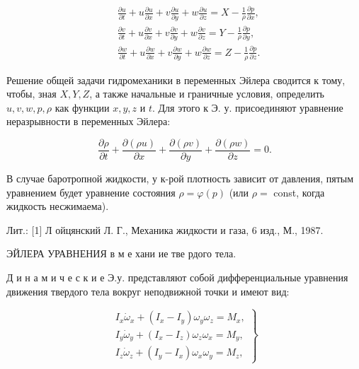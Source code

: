 \documentclass[10pt]{article}
\begin{document}
\[

\begin{aligned}

& \frac{\partial u}{\partial t}+u \frac{\partial u}{\partial x}+v \frac{\partial u}{\partial y}+w \frac{\partial u}{\partial z}=X-\frac{1}{\rho} \frac{\partial p}{\partial x}, \\

& \frac{\partial v}{\partial t}+u \frac{\partial v}{\partial x}+v \frac{\partial v}{\partial y}+w \frac{\partial v}{\partial z}=Y-\frac{1}{\rho} \frac{\partial p}{\partial y}, \\

& \frac{\partial w}{\partial t}+u \frac{\partial w}{\partial x}+v \frac{\partial w}{\partial y}+w \frac{\partial w}{\partial z}=Z-\frac{1}{\rho} \frac{\partial p}{\partial z} .

\end{aligned}

\]



Решение общей задачи гидромеханики в переменных Эйлера сводится к тому, чтобы, зная $X, Y, Z$, а также начальные и граничные условия, определить $u, v, w, p, \rho$ как функции $x, y, z$ и $t$. Для этого к Э. у. присоединяют уравнение неразрывности в переменных Эйлера:



\[

\frac{\partial \rho}{\partial t}+\frac{\partial(\rho u)}{\partial x}+\frac{\partial(\rho v)}{\partial y}+\frac{\partial(\rho w)}{\partial z}=0 .

\]



В случае баротропной жидкости, у к-рой плотность зависит от давления, пятым уравнением будет уравнение состояния $\rho=\varphi(p)$ (или $\rho=$ const, когда жидкость несжимаема).



Лит.: [1] Л ойцянский Л. Г., Механика жидкости и газа, 6 изд., М., 1987.



ЭЙЛЕРА УРАВНЕНИЯ в м е хани ие тве рдого тела.



Д и н а м и ч е с к и е Э.у. представляют собой дифференциальные уравнения движения твердого тела вокруг неподвижной точки и имеют вид:



\[

\left.\begin{array}{l}

I_{x} \dot{\omega}_{x}+\left(I_{x}-I_{y}\right) \omega_{y} \omega_{z}=M_{x}, \\

I_{y} \dot{\omega}_{y}+\left(I_{x}-I_{z}\right) \omega_{z} \omega_{x}=M_{y}, \\

I_{z} \dot{\omega}_{z}+\left(I_{y}-I_{x}\right) \omega_{x} \omega_{y}=M_{z},

\end{array}\right\}

\]
\end{document}
